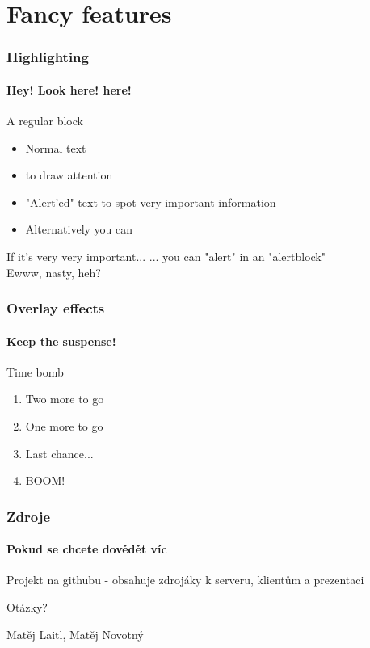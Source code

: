 \documentclass[12pt]{beamer}
\begin{document}
\section{Fancy features}
\begin{frame}
  \frametitle{Highlighting}
  \framesubtitle{Hey! Look here! here!}

  \begin{block}{A regular block}
  \begin{itemize}
    \item Normal text
    \item {} to draw attention
    \item \alert{"Alert'ed" text} to spot very important information
    \item Alternatively you can
  \end{itemize}
  \end{block}
  \begin{alertblock}{If it's very very important...}
  \alert{... you can "alert" in an "alertblock"}\\
  Ewww, nasty, heh?
  \end{alertblock}
\end{frame}

\begin{frame}
  \frametitle{Overlay effects}
  \framesubtitle{Keep the suspense!}
  \begin{block}{Time bomb}
  \begin{enumerate}
    \item<2-> Two more to go
    \item<3-> One more to go
    \item<4-> Last chance...
    \item<5-> BOOM!
  \end{enumerate}
  \end{block}
\end{frame}


\begin{frame}
  \frametitle{Zdroje}
  \framesubtitle{Pokud se chcete dovědět víc}
  \begin{thebibliography}{10}

  \beamertemplatearticlebibitems

    Projekt na githubu - obsahuje zdrojáky k serveru, klientům a prezentaci

  \end{thebibliography}
\end{frame}

\begin{frame}
  \vspace{2cm}
  {\huge Otázky?}

  \vspace{3cm}
  \begin{flushright}
    Matěj Laitl, Matěj Novotný

  \end{flushright}
\end{frame}
\end{document}
